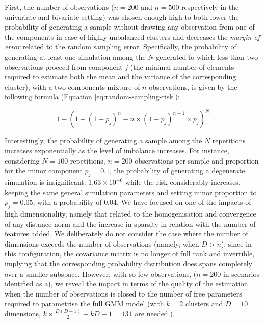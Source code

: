 \label{subsec:benchmark-details}

First, the number of observations (\(n=200\) and \(n=500\) respectively in the univariate and bivariate setting) was chosen enough high to both lower the probability of generating a sample without drawing any observation from one of the components in case of highly-unbalanced clusters and decreases the \emph{margin of error} related to the random sampling error. Specifically, the probability of generating at least one simulation among the \(N\) generated fo which less than two observations proceed from component \(j\) (the minimal number of elements required to estimate both the mean and the variance of the corresponding cluster), with a two-components mixture of \(n\) observations, is given by the following formula (Equation \eqref{eq:random-sampling-risk}):

\begin{equation}
1 - \left(1 - (1-p_j)^n - n \times (1-p_j)^{n-1}\times p_j\right)^N
\label{eq:random-sampling-risk}
\end{equation}

Interestingly, the probability of generating a sample among the \(N\) repetitions increases exponentially as the level of imbalance increases. For instance, considering \(N=100\) repetitions, \(n=200\) observations per sample and proportion for the minor component \(p_j=0.1\), the probability of generating a degenerate simulation is insignificant: \(1.63 \times 10^{-6}\) while the risk considerably increases, keeping the same general simulation parameters and setting minor proportion to \(p_j=0.05\), with a probability of \(0.04\). \color{blue} We have focused on one of the impacts of high dimensionality, namely that related to the homogenisation and convergence of any distance norm and the increase in sparsity in relation with the number of features added. We deliberately do not consider the case where the number of dimensions exceeds the number of observations (namely, when \(D>n\)), since in this configuration, the covariance matrix is no longer of full rank and invertible, implying that the corresponding probability distribution does spans completely over a smaller subspace. However, with so few observations, (\(n=200\) in scenarios identified as a), we reveal the impact in terms of the quality of the estimation when the number of observations is closed to the number of free parameters required to parametrise the full GMM model (with \(k=2\) clusters and \(D=10\) dimensions, \(k \times \frac{D(D+1)}{2} + kD + 1 = 131\) are needed.).\color{black}

